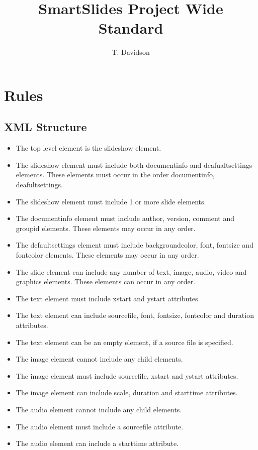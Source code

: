 \documentclass[oneside]{article}
\title{SmartSlides Project Wide Standard}
\author{T. Davidson}
\begin{document}
\maketitle

\clearpage

\section{Rules}
\subsection{XML Structure}
\begin{itemize}
\item The top level element is the slideshow element.
\item The slideshow element must include both documentinfo and deafualtsettings elements. These elements must occur in the order documentinfo, deafultsettings.
\item The slideshow element must include 1 or more slide elements.
\item The documentinfo element must include author, version, comment and groupid elements. These elements may occur in any order.
\item The defaultsettings element must include backgroundcolor, font, fontsize and fontcolor elements. These elements may occur in any order.
\item The slide element can include any number of text, image, audio, video and graphics elements. These elements can occur in any order.
\item The text element must include xstart and ystart attributes.
\item The text element can include sourcefile, font, fontsize, fontcolor and duration attributes.
\item The text element can be an empty element, if a source file is specified.
\item The image element cannot include any child elements.
\item The image element must include sourcefile, xstart and ystart attributes.
\item The image element can include scale, duration and starttime attributes.
\item The audio element cannot include any child elements.
\item The audio element must include a sourcefile attribute.
\item The audio element can include a starttime attribute.

\end{itemize}
\end{document}
